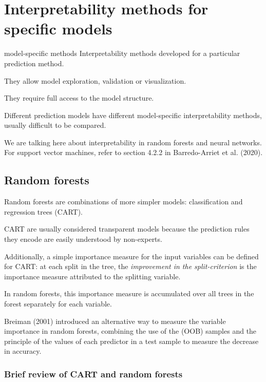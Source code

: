 \chapter{Interpretability methods for specific models}

\begin{definition}{model-specific methods}{}
	Interpretability methods developed for a particular prediction method.

	They allow model exploration, validation or visualization.

	They require full access to the model structure.

	Different prediction models have different model-specific interpretability
	methods, usually difficult to be compared.

	\tcblower

	We are talking here about interpretability in random forests and neural
	networks. For support vector machines, refer to section 4.2.2 in
	Barredo-Arriet et al. (2020).
\end{definition}

\section{Random forests}

Random forests are combinations of more simpler models:
classification and regression trees (CART).

CART are usually considered transparent models because the
prediction rules they encode are easily understood by non-experts.

Additionally, a simple importance measure for the input variables
can be defined for CART: at each split in the tree, the
\emph{improvement in the split-criterion} is the importance measure
attributed to the splitting variable.

In random forests, this importance measure is accumulated over all trees in the forest
separately for each variable.

Breiman (2001) introduced an alternative way to measure the variable importance
in random forests, combining the use of the
 (OOB) samples and the principle of
 the values of each predictor in a test sample to
measure the decrease in accuracy.

\subsection{Brief review of CART and random forests}

